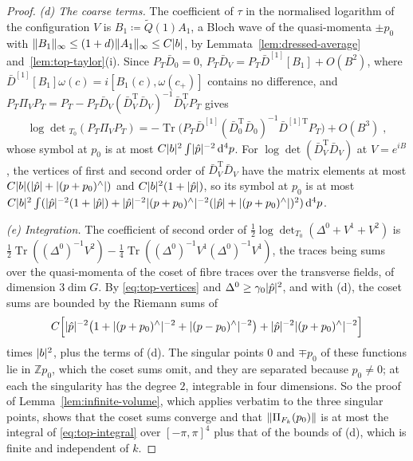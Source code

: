\documentclass[11pt]{preprint}
\newcommand{\dd}{\mathrm{d}}
\DeclarePairedDelimiter{\abs}{\lvert}{\rvert}
\DeclarePairedDelimiter{\norm}{\lVert}{\rVert}
\numberwithin{equation}{section}
\theoremstyle{definition}
\theoremstyle{remark}
\theoremstyle{plain}
\begin{document}
\begin{proof}
\emph{(d) The coarse terms.} The coefficient of $\tau$ in the normalised logarithm of the configuration $V$ is $B_1 \coloneqq \tilde Q(1)A_1$, a Bloch wave of the quasi-momenta $\pm p_0$ with $\norm{B_1}_\infty \leq (1 + d)\norm{A_1}_\infty \leq C\abs{b}$, by Lemmata~\ref{lem:dressed-average} and~\ref{lem:top-taylor}(i). Since $P_T\bar D_0 = 0$, $P_T\bar D_V = P_T\bar D^{[1]}[B_1] + O(B^2)$, where $\bar D^{[1]}[B_1]\omega(c) = i[B_1(c), \omega(c_+)]$ contains no difference, and $P_T\Pi_VP_T = P_T - P_T\bar D_V(\bar D_V^{\mathrm T}\bar D_V)^{-1}\bar D_V^{\mathrm T}P_T$ gives
\begin{equation}\label{eq:coarse-projection-term}
    \log\det{}_{T_0}(P_T\Pi_VP_T) = -\operatorname{Tr}\bigl(P_T\bar D^{[1]}(\bar D_0^{\mathrm T}\bar D_0)^{-1}\bar D^{[1]\mathrm T}P_T\bigr) + O(B^3)\;,
\end{equation}
whose symbol at $p_0$ is at most $C\abs{b}^2\int\abs{\hat p}^{-2}\,\dd^4p$. For $\log\det(\bar D_V^{\mathrm T}\bar D_V)$ at $V = e^{iB}$, the vertices of first and second order of $\bar D_V^{\mathrm T}\bar D_V$ have the matrix elements at most $C\abs{b}(\abs{\hat p} + \abs{(p + p_0)^\wedge})$ and $C\abs{b}^2(1 + \abs{\hat p})$, so its symbol at $p_0$ is at most $C\abs{b}^2\int(\abs{\hat p}^{-2}(1 + \abs{\hat p}) + \abs{\hat p}^{-2}\abs{(p + p_0)^\wedge}^{-2}(\abs{\hat p} + \abs{(p + p_0)^\wedge})^2)\,\dd^4p$.

\emph{(e) Integration.} The coefficient of second order of $\frac12\log\det_{T_0}(\Delta^0 + V^1 + V^2)$ is $\frac12\operatorname{Tr}((\Delta^0)^{-1}V^2) - \frac14\operatorname{Tr}((\Delta^0)^{-1}V^1(\Delta^0)^{-1}V^1)$, the traces being sums over the quasi-momenta of the coset of fibre traces over the transverse fields, of dimension $3\dim G$. By \eqref{eq:top-vertices} and $\Delta^0 \geq \gamma_0\abs{\hat p}^2$, and with (d), the coset sums are bounded by the Riemann sums of
\begin{equation}\label{eq:top-integral}
    C\Bigl[\abs{\hat p}^{-2}\bigl(1 + \abs{(p + p_0)^\wedge}^{-2} + \abs{(p - p_0)^\wedge}^{-2}\bigr) + \abs{\hat p}^{-2}\abs{(p + p_0)^\wedge}^{-2}\Bigr]
\end{equation}
times $\abs{b}^2$, plus the terms of (d). The singular points $0$ and $\mp p_0$ of these functions lie in $\mathbb Zp_0$, which the coset sums omit, and they are separated because $p_0 \neq 0$; at each the singularity has the degree $2$, integrable in four dimensions. So the proof of Lemma~\ref{lem:infinite-volume}, which applies verbatim to the three singular points, shows that the coset sums converge and that $\norm{\Pi_{F_k}(p_0)}$ is at most the integral of \eqref{eq:top-integral} over $[-\pi, \pi]^4$ plus that of the bounds of (d), which is finite and independent of $k$.
\end{proof}
\end{document}
